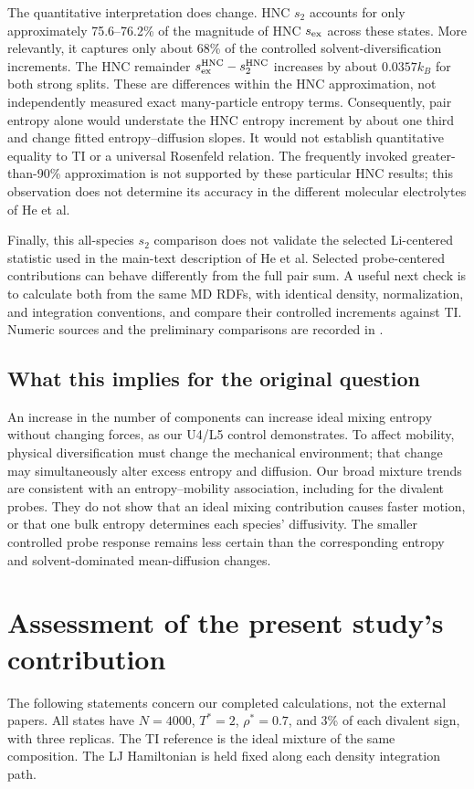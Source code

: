 \documentclass[11pt,a4paper]{article}
\begin{document}
The quantitative interpretation does change. HNC $s_2$ accounts for only
approximately 75.6--76.2\% of the magnitude of HNC $s_{\rm ex}$ across these
states. More relevantly, it captures only about 68\% of the controlled
solvent-diversification increments. The HNC remainder
$s_{\rm ex}^{\rm HNC}-s_2^{\rm HNC}$ increases by about $0.0357k_B$ for
both strong splits. These are differences within the HNC approximation,
not independently measured exact many-particle entropy terms.
Consequently, pair entropy alone would understate the HNC entropy increment
by about one third and change fitted entropy--diffusion slopes. It would
not establish quantitative equality to TI or a universal Rosenfeld relation.
The frequently invoked greater-than-90\% approximation is not supported
by these particular HNC results; this observation does not determine its
accuracy in the different molecular electrolytes of He et al.

Finally, this all-species $s_2$ comparison does not validate the selected
Li-centered statistic used in the main-text description of He et al.
Selected probe-centered contributions can behave differently from the full
pair sum. A useful next check is to calculate both from the same MD RDFs,
with identical density, normalization, and integration conventions, and
compare their controlled increments against TI. Numeric sources and the
preliminary comparisons are recorded in
.

\subsection{What this implies for the original question}
An increase in the number of components can increase ideal mixing entropy
without changing forces, as our U4/L5 control demonstrates. To affect
mobility, physical diversification must change the mechanical environment;
that change may simultaneously alter excess entropy and diffusion. Our broad
mixture trends are consistent with an entropy--mobility association, including
for the divalent probes. They do not show that an ideal mixing contribution
causes faster motion, or that one bulk entropy determines each species'
diffusivity. The smaller controlled probe response remains less certain than
the corresponding entropy and solvent-dominated mean-diffusion changes.

\section{Assessment of the present study's contribution}
The following statements concern our completed calculations, not the external
papers. All states have $N=4000$, $T^*=2$, $\rho^*=0.7$, and 3\% of each
divalent sign, with three replicas. The TI reference is the ideal mixture
of the same composition. The LJ Hamiltonian is held fixed along each density
integration path.
\end{document}
